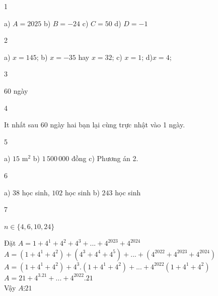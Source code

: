 \begin{Solbook}{1}
 \par \noindent a) $A=2025$ \hfill b) $B=-24$ \hfill c) $C=50$ \hfill d) $D=-1$  \hfill \qedEX 
\end{Solbook}
\begin{Solbook}{2}
 \par \noindent  a) $x=145$;\hspace {1 cm} b) $x=-35$ hay $x=32$; \hspace {1 cm} c) $x=1$; \hspace {1 cm} d)$x=4$; \hspace {1 cm}  \hfill \qedEX 
\end{Solbook}
\begin{Solbook}{3}
 \par \noindent $60$ ngày \hfill \qedEX 
\end{Solbook}
\begin{Solbook}{4}
 \par \noindent  It nhất sau 60 ngày hai bạn lại cùng trực nhật vào 1 ngày.  \hfill \qedEX 
\end{Solbook}
\begin{Solbook}{5}
 \par \noindent  a) $15$ m$^2$ \hfill b) $1\,500\,000$ đồng \hfill c) Phương án 2. \hfill \qedEX 
\end{Solbook}
\begin{Solbook}{6}
 \par \noindent a) $38$ học sinh, $102$ học sinh \hfill b) $243$ học sinh  \hfill \qedEX 
\end{Solbook}
\begin{Solbook}{7}
 \par \noindent  \begin {listEX} \item $n\in \{4,6,10,24\}$ \item Đặt $A=1+4^1+4^2+4^3+...+4^{2023}+4^{2024}$\\ $A=(1+4^1+4^2)+(4^3+4^4+4^5)+...+(4^{2022}+4^{2023}+4^{2024})$ \\ $A=(1+4^1+4^2)+4^3.(1+4^1+4^2)+...+4^{2022}(1+4^1+4^2)$\\ $A= 21+4^3.21+...+4^{2022}.21$\\ Vậy $A \vdots 21$ \end {listEX}  \hfill \qedEX 
\end{Solbook}
